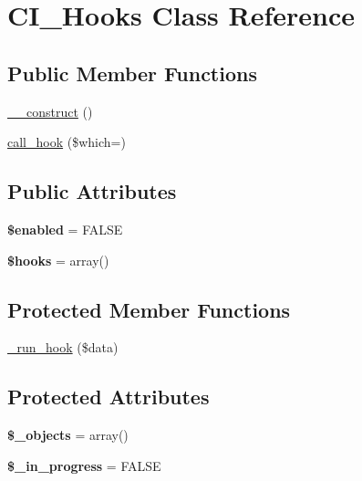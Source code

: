 \hypertarget{class_c_i___hooks}{}\section{C\+I\+\_\+\+Hooks Class Reference}
\label{class_c_i___hooks}
\subsection*{Public Member Functions}
\begin{DoxyCompactItemize}
\item 
\mbox{\hyperlink{class_c_i___hooks_a69efe7c0d75f0e0106d42ea401cf59ec}{\+\_\+\+\_\+construct}} ()
\item 
\mbox{\hyperlink{class_c_i___hooks_aa89ae13d8a7dc735064b70c42db7ef53}{call\+\_\+hook}} (\$which=\textquotesingle{}\textquotesingle{})
\end{DoxyCompactItemize}
\subsection*{Public Attributes}
\begin{DoxyCompactItemize}
\item 
\mbox{\label{class_c_i___hooks_ac3a3f9471b76e0f23ceebae78ad08175}} 
{\bfseries \$enabled} = F\+A\+L\+SE
\item 
\mbox{\label{class_c_i___hooks_aab1285f502edb6fad3687db4cd8d7335}} 
{\bfseries \$hooks} = array()
\end{DoxyCompactItemize}
\subsection*{Protected Member Functions}
\begin{DoxyCompactItemize}
\item 
\mbox{\hyperlink{class_c_i___hooks_ac1ac99a9f45cc07eff8434763e066a5d}{\+\_\+run\+\_\+hook}} (\$data)
\end{DoxyCompactItemize}
\subsection*{Protected Attributes}
\begin{DoxyCompactItemize}
\item 
\mbox{\label{class_c_i___hooks_a05c1c412a3e86bbfa6bf753859c2c956}} 
{\bfseries \$\+\_\+objects} = array()
\item 
\mbox{\label{class_c_i___hooks_afa707f453871b272317cd07d0307cf24}} 
{\bfseries \$\+\_\+in\+\_\+progress} = F\+A\+L\+SE
\end{DoxyCompactItemize}


